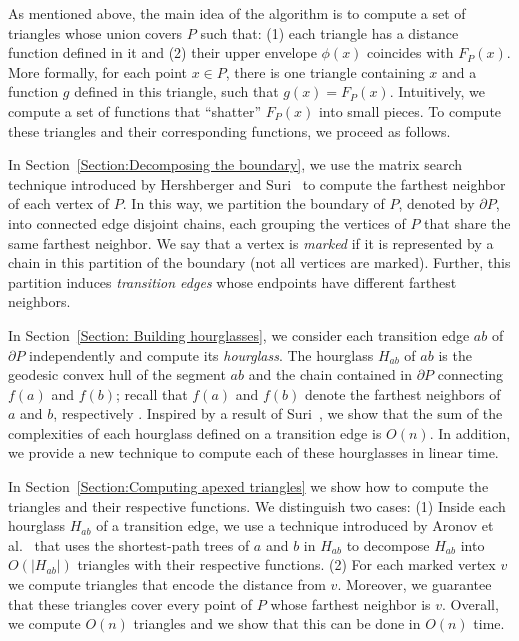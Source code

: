 \documentclass[a4paper,UKenglish]{lipics}
\newcommand{\F}[2]{\ensuremath{F_{\scriptscriptstyle #1}(#2)}}
\newcommand{\ff}[1]{\ensuremath{f(#1)}}
\begin{document}
As mentioned above, the main idea of the algorithm is to compute a set of triangles whose union covers $P$ such that:
(1) each triangle has a distance function defined in it and (2) their upper envelope $\phi(x)$ coincides with $\F{P}{x}$.
More formally, for each point $x\in P$, there is one triangle containing $x$ and a function $g$ defined in this triangle, such that $g(x) = \F{P}{x}$. Intuitively, we compute a set of functions that ``shatter'' $\F{P}{x}$ into small pieces. 
To compute these triangles and their corresponding functions, we proceed as follows.

In Section~\ref{Section:Decomposing the boundary}, we use the matrix search technique introduced by Hershberger and Suri~\cite{hershberger1993matrix} to compute the farthest neighbor of each vertex of $P$. 
In this way, we partition the boundary of $P$, denoted by $\partial P$, into connected edge disjoint chains,
each grouping the vertices of $P$ that share the same farthest neighbor. 
We say that a vertex is \emph{marked} if it is represented by a chain in this partition of the boundary (not all vertices are marked). 
Further, this partition induces \emph{transition edges} whose endpoints have different farthest neighbors. 

In Section~\ref{Section: Building hourglasses}, we consider each transition edge $ab$ of $\partial P$ independently and compute its \emph{hourglass}. The hourglass $H_{ab}$ of $ab$ is the geodesic convex hull of the segment $ab$ and the chain contained in $\partial P$ connecting $\ff{a}$ and $\ff{b}$; recall that $\ff{a}$ and $\ff{b}$ denote the farthest neighbors of $a$ and $b$, respectively . 
Inspired by a result of Suri~\cite{suri1989computing}, we show that the sum of the complexities of each hourglass defined on a transition edge is $O(n)$. 
In addition, we provide a new technique to compute each of these hourglasses in linear time.

In Section~\ref{Section:Computing apexed triangles} we show how to compute the triangles and their respective functions.
We distinguish two cases: (1) Inside each hourglass $H_{ab}$ of a transition edge, we use a technique introduced by Aronov et al.~\cite{aronov1993furthest} that uses the shortest-path trees of $a$ and $b$ in $H_{ab}$ to decompose $H_{ab}$ into $O(|H_{ab}|)$ triangles with their respective functions. 
(2) For each marked vertex $v$ we compute triangles that encode the distance from $v$. Moreover, we guarantee that these triangles cover every point of $P$ whose farthest neighbor is $v$. Overall, we compute $O(n)$ triangles and we show that this can be done in $O(n)$ time.
\end{document}

